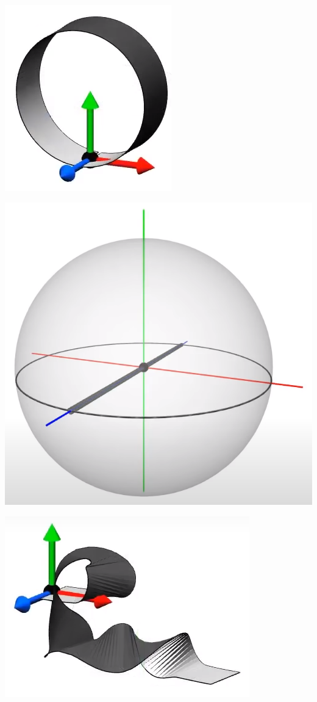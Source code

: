 \documentclass[10pt]{beamer}
\begin{document}
\begin{frame}
    \includegraphics[scale=0.1]{Pictures/zaxisbelt.png}

    \includegraphics[scale=0.1]{Pictures/zaxissphere.png}

    \includegraphics[scale=0.1]{Pictures/randomrotbelt.png}


\end{frame}
\end{document}

